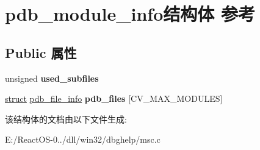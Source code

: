 \hypertarget{structpdb__module__info}{}\section{pdb\+\_\+module\+\_\+info结构体 参考}
\label{structpdb__module__info}
\subsection*{Public 属性}
\begin{DoxyCompactItemize}
\item 
\mbox{\label{structpdb__module__info_ade04b71cf6b5e40ff9fe829e8d97b230}} 
unsigned {\bfseries used\+\_\+subfiles}
\item 
\mbox{\label{structpdb__module__info_a515353bf78b97096ec12f8603f022968}} 
\hyperlink{interfacestruct}{struct} \hyperlink{structpdb__file__info}{pdb\+\_\+file\+\_\+info} {\bfseries pdb\+\_\+files} \mbox{[}C\+V\+\_\+\+M\+A\+X\+\_\+\+M\+O\+D\+U\+L\+ES\mbox{]}
\end{DoxyCompactItemize}


该结构体的文档由以下文件生成\+:\begin{DoxyCompactItemize}
\item 
E\+:/\+React\+O\+S-\/0../dll/win32/dbghelp/msc.\+c\end{DoxyCompactItemize}
